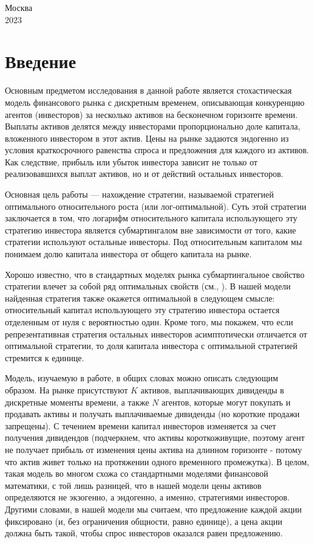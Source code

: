 \documentclass[a4paper,12pt,russian]{article} %
\theoremstyle{definition}
\begin{document}
\begin{center}
    Москва\\
    2023
\end{center}
    \thispagestyle{empty} %
    
    \tableofcontents
    
    \newpage
    
\section{Введение}
Основным предметом исследования в данной работе является стохастическая модель финансового рынка с дискретным временем, описывающая конкуренцию агентов (инвесторов) за несколько активов на бесконечном горизонте времени. Выплаты активов делятся между инвесторами пропорционально доле капитала, вложенного инвестором в этот актив. Цены на рынке задаются эндогенно из условия краткосрочного равенства спроса и предложения для каждого из активов. Как следствие, прибыль или убыток инвестора зависит не только от реализовавшихся выплат активов, но и от действий остальных инвесторов.

Основная цель работы — нахождение стратегии, называемой стратегией оптимального относительного роста (или лог-оптимальной). Суть этой стратегии заключается в том, что логарифм относительного капитала использующего эту стратегию инвестора является субмартингалом вне зависимости от того, какие стратегии используют остальные инвесторы. Под относительным капиталом мы понимаем долю капитала инвестора от общего капитала на рынке.

Хорошо известно, что в стандартных моделях рынка  субмартингальное свойство стратегии влечет за собой ряд оптимальных свойств (см.\cite{AlgoetCover1988}, \cite{KaratzasKardaras2007}). В нашей модели найденная стратегия также окажется оптимальной в следующем смысле: относительный капитал использующего эту стратегию инвестора остается отделенным от нуля с вероятностью один. Кроме того, мы покажем, что если репрезентативная стратегия остальных инвесторов асимптотически отличается от оптимальной стратегии, то доля капитала инвестора с оптимальной стратегией стремится к единице.

Модель, изучаемую в работе, в общих словах можно описать следующим образом. На рынке присутствуют $K$ активов, выплачивающих дивиденды в дискретные моменты времени, а также $N$ агентов, которые могут покупать и продавать активы и получать выплачиваемые дивиденды (но короткие продажи запрещены). С течением времени капитал инвесторов изменяется за счет получения дивидендов (подчеркнем, что активы короткоживущие, поэтому агент не получает прибыль от изменения цены актива на длинном горизонте - потому что актив живет только на протяжении одного временного промежутка). В целом, такая модель во многом схожа со стандартными моделями финансовой математики, с той лишь разницей, что в нашей модели цены активов определяются не экзогенно, а эндогенно, а именно, стратегиями инвесторов. Другими словами, в нашей модели мы считаем, что предложение каждой акции фиксировано (и, без ограничения общности, равно единице), а цена акции должна быть такой, чтобы спрос инвесторов оказался равен предложению.
\end{document}
